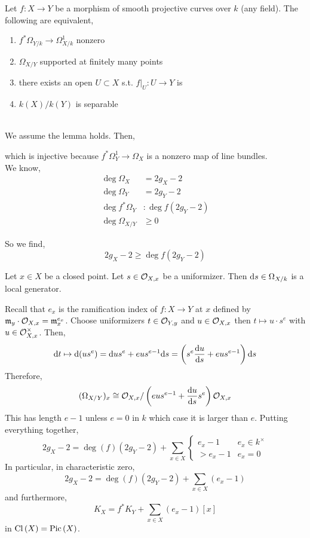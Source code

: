 \documentclass[12pt]{article}
\begin{document}
\begin{lemma}
Let $f : X \to Y$ be a morphism of smooth projective curves over $k$ (any field). 
The following are equivalent,
\begin{enumerate}
\item $f^* \Omega_{Y/k} \to \Omega^1_{X/k}$ nonzero
\item $\Omega_{X/Y}$ supported at finitely many points
\item there exists an open $U \subset X$ s.t. $f|_U : U \to Y$ is \etale
\item $k(X) / k(Y)$ is separable
\end{enumerate}
\end{lemma}
\noindent\\
We assume the lemma holds. Then,
\begin{center}
\end{center}
which is injective because $f^* \Omega^1_{Y} \to \Omega_X$ is a nonzero map of line bundles. 
\bigskip\\
We know,
\begin{align*}
\deg{\Omega_X} & = 2 g_X - 2
\\
\deg{\Omega_Y} & = 2 g_Y - 2
\\
\deg{f^* \Omega_Y} & : \deg{f} (2 g_Y - 2)
\\
\deg{\Omega_{X/Y}} & \ge 0
\end{align*}

So we find,
\[ 2 g_X - 2 \ge \deg{f} (2 g_Y - 2) \]

\begin{lemma}
Let $x \in X$ be a closed point. Let $s \in \mathcal{O}_{X, x}$ be a uniformizer. Then $\mathrm{d}{s} \in \Omega_{X/k}$ is a local generator.
\end{lemma}
\noindent
Recall that $e_x$ is the ramification index of $f : X \to Y$ at $x$ defined by $\mathfrak{m}_y \cdot \mathcal{O}_{X, x} = \mathfrak{m}_x^{e_x}$. Choose uniformizers $t \in \mathcal{O}_{Y, y}$ and $u \in \mathcal{O}_{X, x}$ then $t \mapsto u \cdot s^e$ with $u \in \mathcal{O}_{X, x}^\times$. Then,
\[ \mathrm{d}{t} \mapsto \mathrm{d}{(u s^e)} = \mathrm{d}{u} s^e + e u s^{e-1} \mathrm{d}{s} = \left( s^e \frac{\mathrm{d}{u}}{\mathrm{d}{s}} + e u s^{e - 1} \right) \mathrm{d}{s} \]
Therefore,
\[ (\Omega_{X/Y})_x \cong \mathcal{O}_{X, x} / \left( e u s^{e - 1} + \frac{\mathrm{d}{u}}{\mathrm{d}{s}} s^e \right) \mathcal{O}_{X, x} \]
This has length $e - 1$ unless $e = 0$ in $k$ which case it is larger than $e$. Putting everything together,
\[ 2 g_X - 2 = \deg{(f)} (2 g_Y - 2) + \sum_{x \in X} 
\begin{cases}
e_x - 1 & e_x \in k^\times
\\
> e_x - 1 & e_x = 0
\end{cases} \]
In particular, in characteristic zero,
\[ 2 g_X - 2 = \deg{(f)} (2 g_Y - 2) + \sum_{x \in X} (e_x - 1) \]
and furthermore,
\[ K_X = f^* K_Y + \sum_{x \in X} (e_x - 1) [x] \]
in $\mathrm{Cl} \left( X \right) = \mathrm{Pic} \left( X \right)$. 
\end{document}
